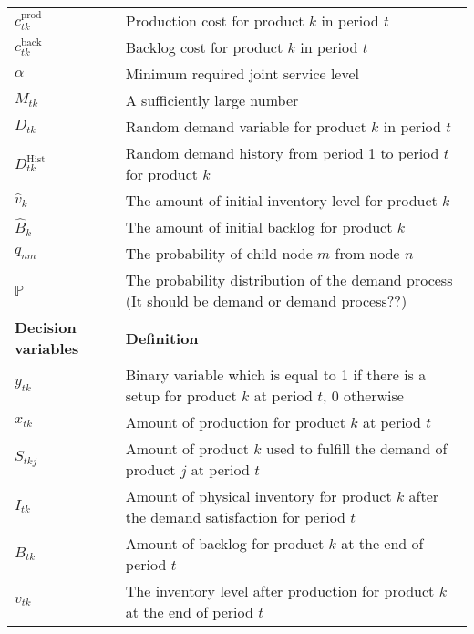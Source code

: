 \documentclass[10pt]{article}
\newcommand{\ti}{t} %
\newcommand{\ka}{k} %
\newcommand{\jey}{j} %
\newcommand{\Bi}{B} %
\newcommand{\Vi}{v} %
\newcommand{\Es}{S} %
\newcommand{\x}{x} %
\newcommand{\y}{y} %
\newcommand{\InvPos}{inventory level after production }
\newcommand{\Csub}{\mathcal{K}^+_k}
\newcommand{\Psub}{\mathcal{K}^-_k}
\newcommand{\cred}{\color{red!65!black}}
\begin{document}
\begin{table}[H]
\begin{adjustbox}{width=1\textwidth,center=\textwidth}
\begin{tabular}{ll}
$c^{\text{prod}}_{\ti \ka}$  & Production cost for product $\ka$ in period $\ti$  \\
$c^{\text{back}}_{\ti \ka}$  & Backlog cost for product $\ka$  in period $\ti$ \\
$\alpha$  & Minimum required joint service level \\ 
$M_{\ti \ka}$  & A sufficiently large number \\ 
${D}_{\ti \ka}$ & Random demand variable for product $\ka $ in period $\ti$  \\ 
${D}^\text{Hist}_{\ti \ka}$ & Random demand history from period 1 to period $\ti$ for product $\ka $  \\ 
$\hat{\Vi}_{\ka} $&  The amount of initial inventory level for product $\ka$ \\
$\hat{\Bi}_{\ka} $&  The amount of initial backlog for product $\ka$   \\
$q_{nm} $&  The probability of child node $m$ from node $n$  \\
$\mathbb{P} $&  The probability distribution of the demand process {\cred(It should be demand or demand process??)}\\ 
\midrule
{\textbf {Decision variables}} & {\textbf {Definition}} \\ \midrule
$\y_{\ti \ka}$ & Binary variable which is equal to 1 if there is a setup for product $k$ at period $\ti$, 0 otherwise \\ 
$\x_{\ti \ka}$ & Amount of production for product $\ka$  at period $\ti$  \\ 
$\Es_{\ti \ka \jey}$ & Amount of product $\ka$  used to fulfill the demand of product $\jey$  at period $\ti$   \\
${I}_{\ti \ka}$ & Amount of physical inventory for product $k$ after the demand satisfaction for period $\ti$  \\
${\Bi}_{\ti \ka}$ & Amount of backlog for product $k$ at the end of period $\ti$  \\
${\Vi}_{\ti \ka}$ & The \InvPos for product $\ka$ at the end of period $\ti$  \\
 \bottomrule
\end{tabular}
\end{adjustbox}
 \label{tab:Sub_parameters}
\end{table}
\end{document}
